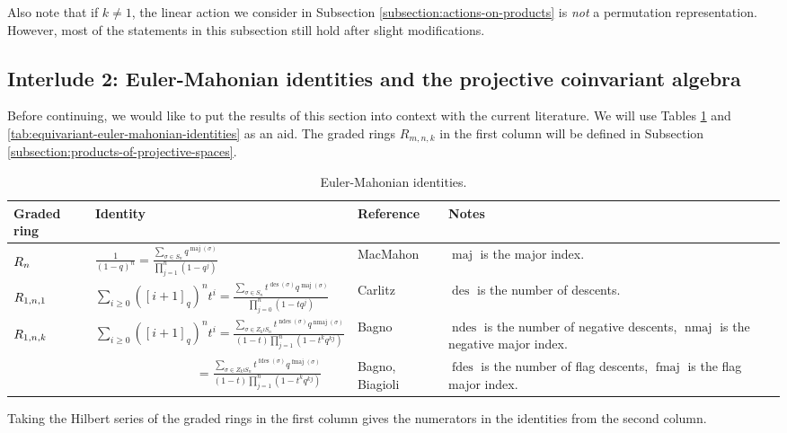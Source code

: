 \documentclass[a4paper,12pt]{amsart}
\theoremstyle{plain}
\theoremstyle{definition}
\theoremstyle{remark}
\DeclareMathOperator{\des}{des}
\DeclareMathOperator{\fdes}{fdes}
\DeclareMathOperator{\fmaj}{fmaj}
\DeclareMathOperator{\maj}{maj}
\DeclareMathOperator{\ndes}{ndes}
\DeclareMathOperator{\nmaj}{nmaj}
\begin{document}
Also note that if $k \neq 1$, the linear action we consider in Subsection \ref{subsection:actions-on-products} is \emph{not} a permutation representation. However, most of the statements in this subsection still hold after slight modifications.


\subsection{Interlude 2: Euler-Mahonian identities and the projective coinvariant algebra}\label{subsection:euler-mahonian-identities}

Before continuing, we would like to put the results of this section into context with the current literature. We will use Tables \ref{tab:euler-mahonian-identities} and \ref{tab:equivariant-euler-mahonian-identities} as an aid. The graded rings $R_{m, n, k}$ in the first column will be defined in Subsection \ref{subsection:products-of-projective-spaces}.
\begin{table}[!ht]
\centering
\small
\begin{tabular}{|p{15mm}|l|p{20mm}|p{45mm}|}
\hline
\textbf{Graded ring} & \textbf{Identity} & \textbf{Reference} & \textbf{Notes} \\
\hline
$\rule{0em}{1.6em} R_n$ & $ \frac{1}{(1-q)^n} = \frac{ \sum_{\sigma \in S_n} q^{\maj(\sigma)}}{\prod_{j=1}^n (1-q^j)}$ & MacMahon \cite{MacMahon} & $\maj$ is the major index. \\
\hline
$\rule{0em}{1.6em} R_{1, n, 1}$ & $\sum_{i \geq 0} ([i + 1]_q)^n t^i = \frac{\sum_{\sigma \in S_n} t^{\des(\sigma)}q^{\maj(\sigma)}}{\prod_{j = 0}^n (1-tq^j)}$ & Carlitz \cite{carlitz-combinatorial} & $\des$ is the number of descents.\\
\hline
$\rule{0em}{1.6em} R_{1, n, k}$ & $\sum_{i \geq 0} ([i + 1]_q)^n t^i = \frac{\sum_{\sigma \in Z_k \wr S_n} t^{\ndes(\sigma)}q^{\nmaj(\sigma)}}{(1 - t)\prod_{j = 1}^n (1-t^kq^{kj})}$ & Bagno \cite{bagno-euler} & $\ndes$ is the number of negative descents, $\nmaj$ is the negative major index.\\
& $\quad\quad\quad\quad\quad\quad\quad\quad = \frac{\sum_{\sigma \in Z_k \wr S_n} t^{\fdes(\sigma)}q^{\fmaj(\sigma)}}{(1 - t)\prod_{j = 1}^n (1-t^kq^{kj})}$ & Bagno, Biagioli \cite{bagno-biagioli-colored} & $\fdes$ is the number of flag descents, $\fmaj$ is the flag major index. \\
\hline
\end{tabular}
\caption{Euler-Mahonian identities.} \normalsize{Taking the Hilbert series of the graded rings in the first column gives the numerators in the identities from the second column.}
\label{tab:euler-mahonian-identities}
\end{table}
\end{document}
